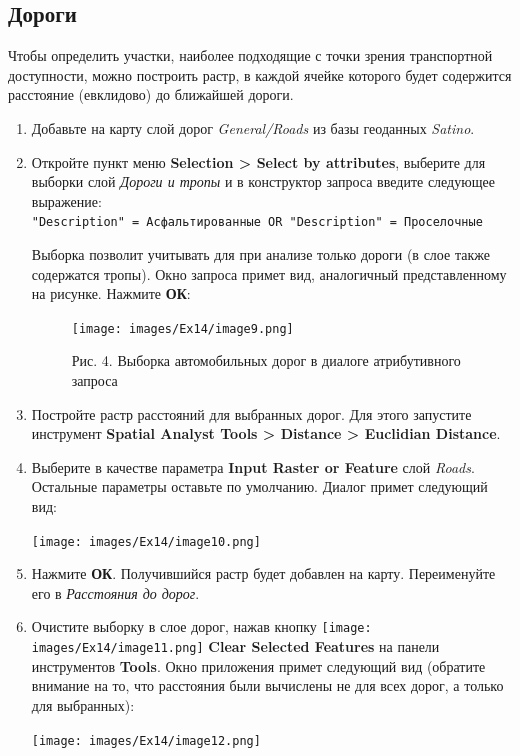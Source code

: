 \documentclass[12pt,]{book}
\begin{document}
\hypertarget{weighted-overlay-roads}{%
\subsection{Дороги}\label{weighted-overlay-roads}}

Чтобы определить участки, наиболее подходящие с точки зрения транспортной доступности, можно построить растр, в каждой ячейке которого будет содержится расстояние (евклидово) до ближайшей дороги.

\begin{enumerate}
\def\labelenumi{\arabic{enumi}.}
\item
  Добавьте на карту слой дорог \emph{General/Roads} из базы геоданных \emph{Satino}.
\item
  Откройте пункт меню \textbf{Selection \textgreater{} Select by attributes}, выберите для выборки слой \emph{Дороги и тропы} и в конструктор запроса введите следующее выражение:
  \texttt{"Description"\ =\ \textquotesingle{}Асфальтированные\textquotesingle{}\ OR\ "Description"\ =\ \textquotesingle{}Проселочные\textquotesingle{}}

  Выборка позволит учитывать для при анализе только дороги (в слое также содержатся тропы). Окно запроса примет вид, аналогичный представленному на рисунке. Нажмите \textbf{ОК}:

  \begin{figure}
  \centering
  \texttt{[image: images/Ex14/image9.png]}
  \caption{Рис. 4. Выборка автомобильных дорог в диалоге атрибутивного запроса}
  \end{figure}
\item
  Постройте растр расстояний для выбранных дорог. Для этого запустите инструмент \textbf{Spatial Analyst Tools \textgreater{} Distance \textgreater{} Euclidian Distance}.
\item
  Выберите в качестве параметра \textbf{Input Raster or Feature} слой \emph{Roads}. Остальные параметры оставьте по умолчанию. Диалог примет следующий вид:

  \texttt{[image: images/Ex14/image10.png]}
\item
  Нажмите \textbf{ОК}. Получившийся растр будет добавлен на карту. Переименуйте его в \emph{Расстояния до дорог}.
\item
  Очистите выборку в слое дорог, нажав кнопку \texttt{[image: images/Ex14/image11.png]} \textbf{Clear Selected Features} на панели инструментов \textbf{Tools}. Окно приложения примет следующий вид (обратите внимание на то, что расстояния были вычислены не для всех дорог, а только для выбранных):

  \texttt{[image: images/Ex14/image12.png]}
\end{enumerate}
\end{document}
